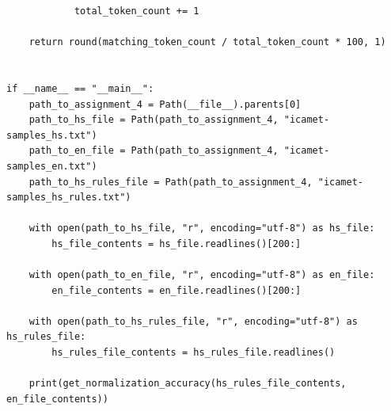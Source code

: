 \documentclass{article}
\begin{document}
\begin{lstlisting}
            total_token_count += 1

    return round(matching_token_count / total_token_count * 100, 1)


if __name__ == "__main__":
    path_to_assignment_4 = Path(__file__).parents[0]
    path_to_hs_file = Path(path_to_assignment_4, "icamet-samples_hs.txt")
    path_to_en_file = Path(path_to_assignment_4, "icamet-samples_en.txt")
    path_to_hs_rules_file = Path(path_to_assignment_4, "icamet-samples_hs_rules.txt")

    with open(path_to_hs_file, "r", encoding="utf-8") as hs_file:
        hs_file_contents = hs_file.readlines()[200:]

    with open(path_to_en_file, "r", encoding="utf-8") as en_file:
        en_file_contents = en_file.readlines()[200:]

    with open(path_to_hs_rules_file, "r", encoding="utf-8") as hs_rules_file:
        hs_rules_file_contents = hs_rules_file.readlines()

    print(get_normalization_accuracy(hs_rules_file_contents, en_file_contents))

\end{lstlisting}
\end{document}
